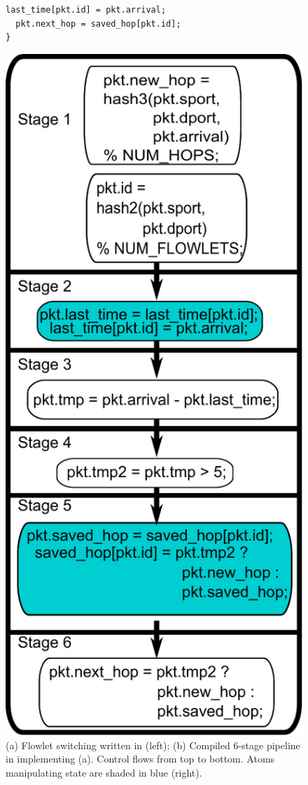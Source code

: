 \begin{figure}[!t]
\begin{minipage}{0.6\textwidth}
\begin{small}
\begin{lstlisting}[style=customc]
  last_time[pkt.id] = pkt.arrival;
  pkt.next_hop = saved_hop[pkt.id];
}
\end{lstlisting}
\end{small}
\end{minipage}
%
\vrule\quad
%
\begin{minipage}{0.4\textwidth}
\includegraphics[width=0.8\columnwidth]{pipe.pdf}
\end{minipage}
\caption{\small (a) Flowlet switching written in \pktlanguage (left);
(b) Compiled 6-stage pipeline in \absmachine implementing (a).  Control flows
from top to bottom. Atoms manipulating state are shaded in blue (right).}
\label{fig:flowlet}
\end{figure}

